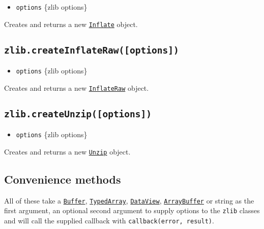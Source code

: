 \begin{itemize}
\tightlist
\item
  \texttt{options} \{zlib options\}
\end{itemize}

Creates and returns a new \hyperref[class-zlibinflate]{\texttt{Inflate}}
object.

\subsection{\texorpdfstring{\texttt{zlib.createInflateRaw({[}options{]})}}{zlib.createInflateRaw({[}options{]})}}\label{zlib.createinflaterawoptions}

\begin{itemize}
\tightlist
\item
  \texttt{options} \{zlib options\}
\end{itemize}

Creates and returns a new
\hyperref[class-zlibinflateraw]{\texttt{InflateRaw}} object.

\subsection{\texorpdfstring{\texttt{zlib.createUnzip({[}options{]})}}{zlib.createUnzip({[}options{]})}}\label{zlib.createunzipoptions}

\begin{itemize}
\tightlist
\item
  \texttt{options} \{zlib options\}
\end{itemize}

Creates and returns a new \hyperref[class-zlibunzip]{\texttt{Unzip}}
object.

\subsection{Convenience methods}\label{convenience-methods}

All of these take a \href{buffer.md\#class-buffer}{\texttt{Buffer}},
\href{https://developer.mozilla.org/en-US/docs/Web/JavaScript/Reference/Global_Objects/TypedArray}{\texttt{TypedArray}},
\href{https://developer.mozilla.org/en-US/docs/Web/JavaScript/Reference/Global_Objects/DataView}{\texttt{DataView}},
\href{https://developer.mozilla.org/en-US/docs/Web/JavaScript/Reference/Global_Objects/ArrayBuffer}{\texttt{ArrayBuffer}}
or string as the first argument, an optional second argument to supply
options to the \texttt{zlib} classes and will call the supplied callback
with \texttt{callback(error,\ result)}.

